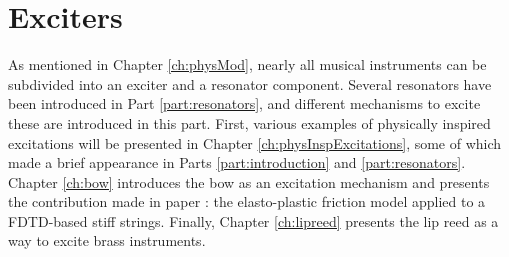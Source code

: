 \chapter*{Exciters}
As mentioned in Chapter \ref{ch:physMod}, nearly all musical instruments can be subdivided into an exciter and a resonator component. Several resonators have been introduced in Part \ref{part:resonators}, and different mechanisms to excite these are introduced in this part. First, various examples of physically inspired excitations will be presented in Chapter \ref{ch:physInspExcitations}, some of which made a brief appearance in Parts \ref{part:introduction} and \ref{part:resonators}. Chapter \ref{ch:bow} introduces the bow as an excitation mechanism and presents the contribution made in paper \citeP[C]: the elasto-plastic friction model applied to a FDTD-based stiff strings. Finally, Chapter \ref{ch:lipreed} presents the lip reed as a way to excite brass instruments. 